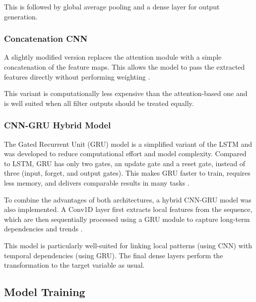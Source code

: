 This is followed by global average pooling and a dense layer for output generation.



\subsubsection{Concatenation CNN}

A slightly modified version replaces the attention module with a simple concatenation of the feature maps.
This allows the model to pass the extracted features directly without performing weighting \cite{keras-concat}.

This variant is computationally less expensive than the attention-based one and is well suited when all filter outputs should be treated equally.



\subsubsection{CNN-GRU Hybrid Model}

The Gated Recurrent Unit (GRU) model is a simplified variant of the LSTM and was developed to reduce computational effort and model complexity.
Compared to LSTM, GRU has only two gates, an update gate and a reset gate, instead of three (input, forget, and output gates).
This makes GRU faster to train, requires less memory, and delivers comparable results in many tasks \cite{gru-basics}.

To combine the advantages of both architectures, a hybrid CNN-GRU model was also implemented.
A Conv1D layer first extracts local features from the sequence, which are then sequentially processed using a GRU module to capture long-term dependencies and trends \cite{cnn-gru}.

This model is particularly well-suited for linking local patterns (using CNN) with temporal dependencies (using GRU).
The final dense layers perform the transformation to the target variable as usual.



\subsection{Model Training}


